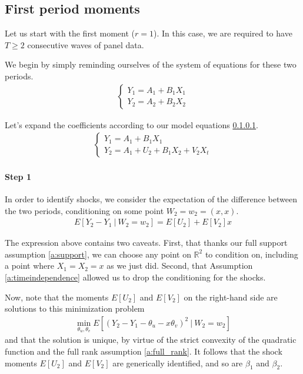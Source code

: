 \subsection{First period moments}

Let us start with the first moment ($r = 1$). In this case, we are required to have $T \geq 2$ consecutive waves of panel data. 


We begin by simply reminding ourselves of the system of equations for these two periods.
\begin{align}
  \begin{cases}
    Y_{1} = A_{1} + B_{1}X_{1} \\ 
    Y_{2} = A_{2} + B_{2}X_{2} 
  \end{cases}
\end{align}

Let's expand the coefficients according to our model equations \ref{}.
\begin{align}
  \begin{cases}
    Y_{1} = A_{1} + B_{1}X_{1} \\ 
    Y_{2} = A_{1} + U_{2} + B_{1}X_{2} + V_{2}X_{t} \label{eq:expanded}
  \end{cases}
\end{align}


\paragraph{Step 1} In order to identify shocks, we consider the expectation of the difference between the two periods, conditioning on some point $W_2 = w_2 = (x, x)$.
\begin{align}
  E[Y_{2} - Y_{1} \ | \  W_{2} = w_{2}] = 
  E[U_{2}] + E[V_{2}]x
\end{align}

\noindent The expression above contains two caveats. First, that thanks our full support assumption \ref{a:support}, we can choose any point on $\mathbb{R}^2$ to condition on, including a point where $X_1 = X_2 = x$ as we just did. Second, that Assumption \ref{a:timeindependence} allowed us to drop the conditioning for the shocks.

Now, note that the moments $E[U_2]$ and $E[V_2]$ on the right-hand side are solutions to this minimization problem
\begin{align}
  \min_{\theta_u, \theta_v}  
  E[(Y_{2} - Y_{1} - \theta_u -  x\theta_v)^2 \  | \ W_2 = w_2]
\end{align}
\noindent and that the solution is unique, by virtue of the strict convexity of the quadratic function and the full rank assumption \ref{a:full_rank}. It follows that the shock moments $E[U_2]$ and $E[V_2]$ are generically identified, and so are $\beta_1$ and $\beta_2$.


